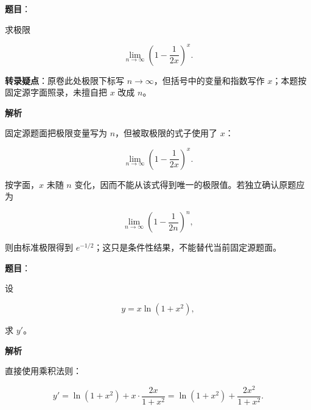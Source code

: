 \begin{answer}

\textbf{题目}：

求极限

\nopagebreak[4]
\[
\lim_{n\to\infty}\left(1-\frac1{2x}\right)^x.
\]

\begin{gktip}
\textbf{转录疑点}：原卷此处极限下标写 $n\to\infty$，但括号中的变量和指数写作 $x$；本题按固定源字面照录，未擅自把 $x$ 改成 $n$。
\end{gktip}

\textbf{解析}

固定源题面把极限变量写为 $n$，但被取极限的式子使用了 $x$：

\nopagebreak[4]
\[
\lim_{n\to\infty}\left(1-\frac1{2x}\right)^x.
\]

按字面，$x$ 未随 $n$ 变化，因而不能从该式得到唯一的极限值。若独立确认原题应为

\nopagebreak[4]
\[
\lim_{n\to\infty}\left(1-\frac1{2n}\right)^n,
\]

则由标准极限得到 $e^{-1/2}$；这只是条件性结果，不能替代当前固定源题面。


\end{answer}
\begin{answer}

\textbf{题目}：

设

\nopagebreak[4]
\[
y=x\ln(1+x^2),
\]

求 $y'$。

\textbf{解析}

直接使用乘积法则：

\nopagebreak[4]
\[
y'=\ln(1+x^2)+x\cdot\frac{2x}{1+x^2}
=\ln(1+x^2)+\frac{2x^2}{1+x^2}.
\]


\end{answer}